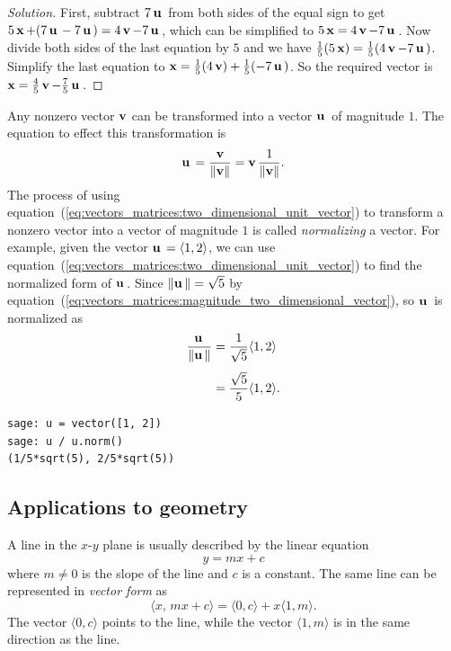 \begin{proof}[Solution]
First, subtract $7\operatorname*{\mathbf{u}}{}$ from both sides of the equal sign to get
$5\operatorname*{\mathbf{x}} + (7\operatorname*{\mathbf{u}}{} - 7\operatorname*{\mathbf{u}}{}) = 4\operatorname*{\mathbf{v}} - 7\operatorname*{\mathbf{u}}{}$, which can be
simplified to $5\operatorname*{\mathbf{x}} = 4\operatorname*{\mathbf{v}} - 7\operatorname*{\mathbf{u}}{}$. Now divide both sides of
the last equation by $5$ and we have
$\frac{1}{5} (5\operatorname*{\mathbf{x}}) = \frac{1}{5} (4\operatorname*{\mathbf{v}} - 7\operatorname*{\mathbf{u}}{})$. Simplify the
last equation to
$\operatorname*{\mathbf{x}} = \frac{1}{5} (4\operatorname*{\mathbf{v}}) + \frac{1}{5}(-7\operatorname*{\mathbf{u}}{})$. So the required
vector is $\operatorname*{\mathbf{x}} = \frac{4}{5}\operatorname*{\mathbf{v}} - \frac{7}{5}\operatorname*{\mathbf{u}}{}$.
\end{proof}

Any nonzero vector $\operatorname*{\mathbf{v}}$ can be transformed into a vector $\operatorname*{\mathbf{u}}{}$ of
magnitude $1$. The equation to effect this transformation is
%
\begin{equation}
\label{eq:vectors_matrices:two_dimensional_unit_vector}
\operatorname*{\mathbf{u}}{}
=
\frac {\operatorname*{\mathbf{v}}} {\left\Arrowvert \operatorname*{\mathbf{v}} \right\Arrowvert}
=
\operatorname*{\mathbf{v}}
\frac {1} {\left\Arrowvert \operatorname*{\mathbf{v}} \right\Arrowvert}.
\end{equation}
%
The process of using
equation~(\ref{eq:vectors_matrices:two_dimensional_unit_vector}) to
transform a nonzero vector into a vector of magnitude $1$ is called
\emph{normalizing} a vector. For example,
given the vector $\operatorname*{\mathbf{u}}{} = \langle 1, 2 \rangle$, we can use
equation~(\ref{eq:vectors_matrices:two_dimensional_unit_vector}) to
find the normalized form of $\operatorname*{\mathbf{u}}{}$. Since
$\left\Arrowvert \operatorname*{\mathbf{u}}{} \right\Arrowvert = \sqrt{5}$ by
equation~(\ref{eq:vectors_matrices:magnitude_two_dimensional_vector}),
so $\operatorname*{\mathbf{u}}{}$ is normalized as
%
\begin{align*}
\frac {\operatorname*{\mathbf{u}}{}} {\left\Arrowvert \operatorname*{\mathbf{u}}{} \right\Arrowvert}
&=
\frac{1}{\sqrt{5}} \langle 1, 2 \rangle \\[4pt]
&=
\frac{\sqrt{5}}{5} \langle 1, 2 \rangle.
\end{align*}

\begin{lstlisting}
sage: u = vector([1, 2])
sage: u / u.norm()
(1/5*sqrt(5), 2/5*sqrt(5))
\end{lstlisting}



\subsection{Applications to geometry}
\label{subsec:2D_vectors_apply_geometry}

A line in the $x$-$y$ plane is usually described by the linear
equation
\[
y = mx + c
\]
where $m \neq 0$ is the slope of the line and $c$ is a constant. The
same line can be represented in \emph{vector form}
as
%
\begin{equation}
\label{eq:vector_form_line}
\langle x,\, mx + c \rangle
=
\langle 0, c \rangle + x \langle 1, m \rangle.
\end{equation}
%
The vector $\langle 0, c \rangle$ points to the line, while the vector
$\langle 1, m \rangle$ is in the same direction as the line.

